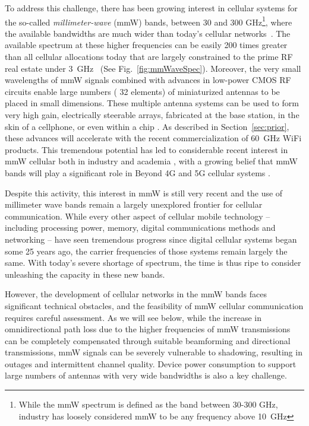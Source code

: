 \documentclass[journal]{IEEEtran}
\begin{document}
To address this challenge, there has been growing interest in
cellular systems for the so-called \emph{millimeter-wave} (mmW) bands,
between 30 and 300 GHz\footnote{While the mmW spectrum is defined
as the band between 30-300 GHz, industry has loosely considered mmW to be any
frequency above 10~GHz}, where the available bandwidths are much wider than today's
cellular networks~\cite{KhanPi:11,KhanPi:11-CommMag,Ted:60Gstate11,PietBRPC:12}.
The available spectrum at these higher frequencies can be easily 200 times
greater than all cellular allocations today that are largely constrained
to the
prime RF real estate under 3~GHz~\cite{Ted:60Gstate11,KhanPi:11-CommMag}
(See Fig.~\ref{fig:mmWaveSpec}).
Moreover, the very small wavelengths of mmW signals combined with advances
in low-power CMOS RF
circuits enable large numbers ( 32 elements) of  miniaturized antennas
to be placed in small dimensions.  These multiple antenna systems
can be used to form very high gain, electrically steerable arrays,
fabricated at the base station, in the skin of a cellphone,
or even within a chip \cite{Doan:04,Doan:05,ZhaLiu:09,gutierrez2009chip,Nsenga:10,Ted:60Gstate11,Rajagopal:mmWMobile,Huang:2008:MWA:1524107,Rusek:13}.
As described in Section~\ref{sec:prior}, these advances will accelerate with the
recent commercialization of 60~GHz WiFi products.
This tremendous potential has led to considerable recent interest in mmW cellular
both in industry
\cite{KhanPi:11,KhanPi:11-CommMag,PietBRPC:12,hur2013millimeter,Samsung5G:13} and academia
\cite{fettweis2005wigwam,laskar2007next,AkoumAyaHeath:12,ZhangMadhow1,ZhangMadhow2,ZhangMadhow3,rappaportmillimeter},
with a growing belief that mmW bands will play a significant role in Beyond 4G and 5G cellular systems
\cite{BocHLMP:14}.


Despite this activity, this interest in mmW is still very recent and the use of
millimeter wave bands remain a largely unexplored frontier for cellular communication.
While every other aspect of cellular mobile technology -- including
processing power, memory, digital communications methods and networking --
have seen tremendous progress since digital cellular systems began some
25 years ago, the carrier frequencies
of those systems remain largely the same.  With today's severe shortage of spectrum, the time is thus ripe
to consider unleashing the capacity in these new bands.

However, the development of cellular networks in the mmW bands
faces significant technical obstacles, and the feasibility of mmW cellular
communication requires careful assessment.
As we will see below,  while the increase in omnidirectional
path loss due to the higher frequencies of mmW transmissions
can be completely compensated through suitable beamforming and directional transmissions, mmW signals
can be severely vulnerable to shadowing, resulting in outages and
intermittent channel quality.
Device power consumption to support large numbers of antennas
with very wide bandwidths is also a key challenge.
\end{document}
